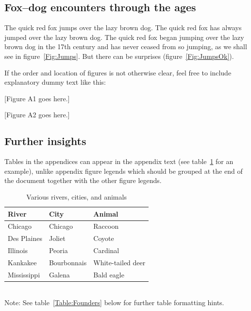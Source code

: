 ﻿\documentclass[11pt]{article}
\begin{document}
\renewcommand{\theequation}{A\arabic{equation}}
\renewcommand{\thetable}{A\arabic{table}}
\setcounter{equation}{0}  %
\setcounter{figure}{0}
\setcounter{table}{0}

\subsection*{Fox--dog encounters through the ages}

The quick red fox jumps over the lazy brown dog. The quick red fox has always jumped over the lazy brown dog. The quick red fox began jumping over the lazy brown dog in the 17th century and has never ceased from so jumping, as we shall see in figure~\ref{Fig:Jumps}. But there can be surprises (figure~\ref{Fig:JumpsOk}).

If the order and location of figures is not otherwise clear, feel free to include explanatory dummy text like this:

[Figure A1 goes here.]

[Figure A2 goes here.]

\subsection*{Further insights}

Tables in the appendices can appear in the appendix text (see table~\ref{Table:Rivers} for an example), unlike appendix figure legends which should be grouped at the end of the document together with the other figure legends.

\begin{table}[h]
\caption{Various rivers, cities, and animals}
\label{Table:Rivers}
\centering
\begin{tabular}{lll}\hline
River        & City        & Animal            \\ \hline
Chicago      & Chicago     & Raccoon           \\
Des Plaines  & Joliet      & Coyote            \\
Illinois     & Peoria      & Cardinal          \\
Kankakee     & Bourbonnais & White-tailed deer \\
Mississippi  & Galena      & Bald eagle        \\ \hline
\end{tabular}
\bigskip{}
\\
{\footnotesize Note: See table~\ref{Table:Founders} below for further table formatting hints.}
\end{table}
\end{document}

